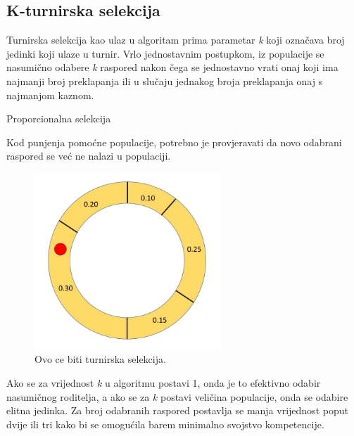 \documentclass[times, utf8, zavrsni]{fer}
\begin{document}
\subsection{K-turnirska selekcija}

Turnirska selekcija kao ulaz u algoritam prima parametar \emph{k} koji označava broj jedinki koji ulaze u turnir. Vrlo jednostavnim postupkom, iz populacije se nasumično odabere \emph{k} raspored nakon čega se jednostavno vrati onaj koji ima najmanji broj preklapanja ili u slučaju jednakog broja preklapanja onaj s najmanjom kaznom.

\begin{algorithm}
\caption{Proporcionalna selekcija}
\label{algo:proporcionalno}
\begin{algorithmic}
\ENDIF
\ENDWHILE
{}
\end{algorithmic}
\end{algorithm}

Kod punjenja pomoćne populacije, potrebno je provjeravati da novo odabrani raspored se već ne nalazi u populaciji.

\begin{figure}[htb]
\centering
\includegraphics[width=7cm]{images/rulet.png}
\caption{Ovo ce biti turnirska selekcija.}
\label{fig:rulet}
\end{figure}

Ako se za vrijednost \emph{k} u algoritmu postavi 1, onda je to efektivno odabir nasumičnog roditelja, a ako se za \emph{k} postavi veličina populacije, onda se odabire elitna jedinka. Za broj odabranih raspored postavlja se manja vrijednost poput dvije ili tri kako bi se omogućila barem minimalno svojstvo kompetencije.
\end{document}
